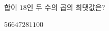 \hspace*{2mm}\begin{minipage}[t]{\dimexpr\linewidth-2mm\relax}\vspace{0pt}
합이 $18$인 두 수의 곱의 최댓값은?
\begin{choices32}{$56$}{$64$}{$72$}{$81$}{$100$}\end{choices32}\end{minipage}
